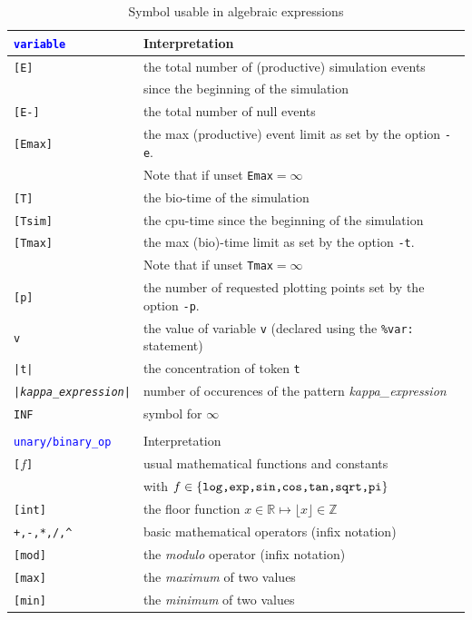 \documentclass[11pt]{book}
\def\tcb#1{\textcolor{blue}{\ttt{#1}}}
\def\ttt#1{\texttt{#1}}
\def\var#1{{\textquotesingle}#1{\textquotesingle}}
\def\set#1{\{#1\}}
\def\Real{\mathbb R}
\def\Z{\mathbb Z}
\begin{document}
\begin{table}[htbp]
\centering
\caption{Symbol usable in algebraic expressions%
}
\begin{tabular}{@{} l|l @{} }
\toprule
\ttt{\tcb{variable}} & Interpretation \\
\midrule
\ttt{[E]} & the total number of (productive) simulation events\index{event}\\
& since the beginning of the simulation \\
\ttt{[E-]} & the total number of null events\index{null event}\\
\ttt{[Emax]} & the max (productive) event limit as set by the option \ttt{-e}. \\ &Note that if unset \ttt{Emax}$=\infty$\\
\ttt{[T]} & the bio-time of the simulation \\
\ttt{[Tsim]} & the cpu-time since the beginning of the simulation \\
\ttt{[Tmax]} & the max (bio)-time limit as set by the option \ttt{-t}. \\ &Note that if unset \ttt{Tmax}$=\infty$\\
\ttt{[p]} & the number of requested plotting points set by the option \ttt{-p}. \\

\ttt{\var{v}} & the value of variable \ttt{\var{v}} (declared using the \ttt{\%var:} statement) \\
\ttt{|t|} & the concentration of token \ttt{t}\\
\ttt{|\textit{kappa\_expression}|} & number of occurences of the pattern \textit{kappa\_expression}\\
\ttt{INF} & symbol for $\infty$ \\\\
\toprule
\ttt{\tcb{unary/binary\_op}} & Interpretation \\
\midrule
\ttt{[}$f$\texttt{]} & usual mathematical functions and constants \\ &with $f\in\set{\hbox{\ttt{log,exp,sin,cos,tan,sqrt,pi}}}$ \\
\ttt{[int]} & the floor function $x\in\Real\mapsto \lfloor x\rfloor\in\Z$ \\
\ttt{+,-,*,/,\textasciicircum} & basic mathematical operators (infix notation)\\
\ttt{[mod]} & the \emph{modulo} operator (infix notation)\\
\ttt{[max]} & the \emph{maximum} of two values \\
\ttt{[min]} & the \emph{minimum} of two values \\
\bottomrule
\end{tabular}
\label{tab:operators}
\end{table}
\end{document}
